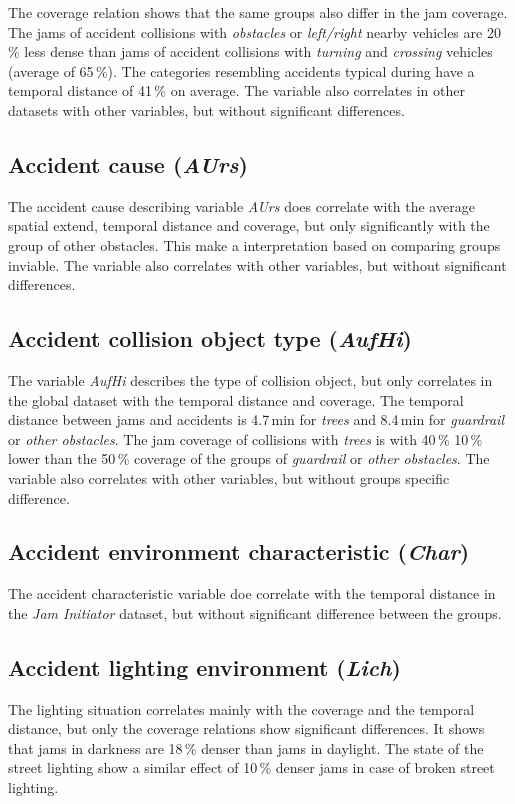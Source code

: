 The coverage relation shows that the same groups also differ in the jam coverage. The jams of accident collisions with \textit{obstacles} or \textit{left/right} nearby vehicles are 20\,\% less dense than jams of accident collisions with \textit{turning} and \textit{crossing} vehicles (average of 65\,\%). The categories resembling accidents typical during have a temporal distance of 41\,\% on average. The variable also correlates in other datasets with other variables, but without significant differences.

\subsection{Accident cause (\textit{AUrs})}
The accident cause describing variable \textit{AUrs} does correlate with the average spatial extend, temporal distance and coverage, but only significantly with the group of other obstacles. This make a interpretation based on comparing groups inviable. The variable also correlates with other variables, but without significant differences.

\subsection{Accident collision object type (\textit{AufHi})}
The variable \textit{AufHi} describes the type of collision object, but only correlates in the global dataset with the temporal distance and coverage. The temporal distance between jams and accidents is 4.7\,min for \textit{trees} and 8.4\,min for \textit{guardrail} or \textit{other obstacles}. The jam coverage of collisions with \textit{trees} is with 40\,\% 10\,\% lower than the 50\,\% coverage of the groups of \textit{guardrail} or \textit{other obstacles}. The variable also correlates with other variables, but without groups specific difference.

\subsection{Accident environment characteristic (\textit{Char})}
The accident characteristic variable doe correlate with the temporal distance in the \textit{Jam Initiator} dataset, but without significant difference between the groups.

\subsection{Accident lighting environment (\textit{Lich})}
The lighting situation correlates mainly with the coverage and the temporal distance, but only the coverage relations show significant differences. It shows that jams in darkness are 18\,\% denser than jams in daylight. The state of the street lighting show a similar effect of 10\,\% denser jams in case of broken street lighting.

